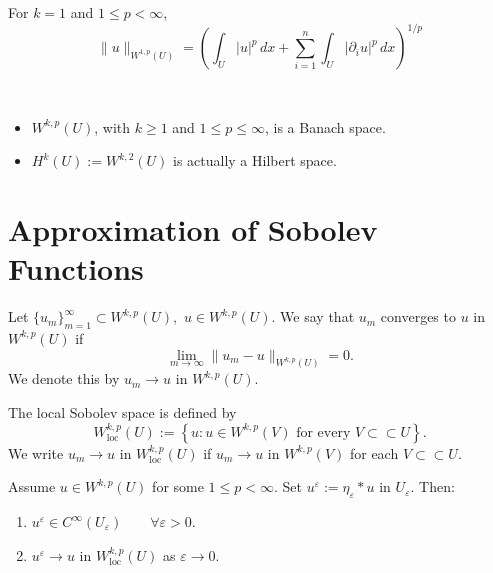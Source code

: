     \begin{example}
    For $k=1$ and $1\le p<\infty$,
    $$
    \|u\|_{W^{1,p}(U)}
    =
    \left(
    \int_U |u|^p\,dx
    +
    \sum_{i=1}^n
    \int_U
    \left|
    \partial_i u
    \right|^p
    \,dx
    \right)^{1/p}
    $$
    \end{example}

    \begin{remark}\
        \begin{itemize}
            \item $W^{k,p}(U)$, with $k\ge 1$ and $1\le p\le \infty$, is a Banach space.
            \item $H^k(U) := W^{k,2}(U)$ is actually a Hilbert space.
        \end{itemize}
    \end{remark}


    \section{Approximation of Sobolev Functions}

\begin{definition}
Let
$
\{u_m\}_{m=1}^{\infty}\subset W^{k,p}(U),
$
$
u\in W^{k,p}(U).
$
We say that $u_m$ converges to $u$ in $W^{k,p}(U)$ if
$$
\lim_{m\to\infty}
\|u_m-u\|_{W^{k,p}(U)}
=0.
$$
We denote this by
$
u_m\to u
$
in
$W^{k,p}(U).
$
\end{definition}

\begin{definition}
The local Sobolev space is defined by
$$
W^{k,p}_{\mathrm{loc}}(U)
:=
\left\{
u:
u\in W^{k,p}(V)
\text{ for every } V\subset\subset U
\right\}.
$$
We write
$
u_m\to u
$
in
$W^{k,p}_{\mathrm{loc}}(U)
$
if
$
u_m\to u
$
in
$W^{k,p}(V)
$
for each
$
V\subset\subset U.
$
\end{definition}

\begin{theorem}
Assume
$
u\in W^{k,p}(U)
$
for some
$
1\le p<\infty.
$
Set
$
u^\varepsilon:=\eta_\varepsilon*u
$
in
$U_\varepsilon.
$
Then:
\begin{enumerate}
    \item
    $
    u^\varepsilon\in C^\infty(U_\varepsilon)
    \qquad
    \forall \varepsilon>0.
    $

    \item
    $
    u^\varepsilon\to u
    \text{ in } W^{k,p}_{\mathrm{loc}}(U)
    $
    as
    $
    \varepsilon\to 0.
    $
\end{enumerate}
\end{theorem}

